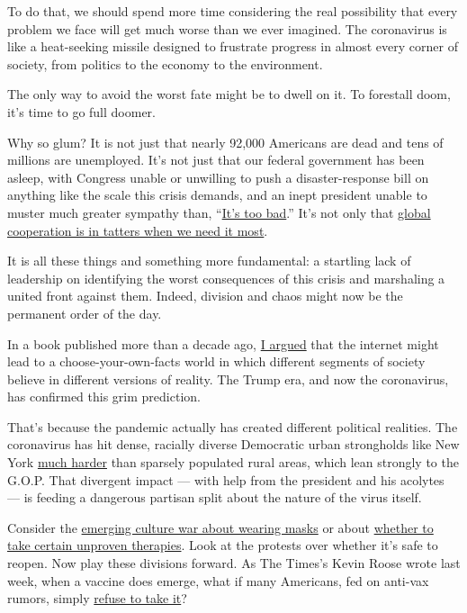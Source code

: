 To do that, we should spend more time considering the real possibility
that every problem we face will get much worse than we ever imagined.
The coronavirus is like a heat-seeking missile designed to frustrate
progress in almost every corner of society, from politics to the economy
to the environment.

The only way to avoid the worst fate might be to dwell on it. To
forestall doom, it's time to go full doomer.

Why so glum? It is not just that nearly 92,000 Americans are dead and
tens of millions are unemployed. It's not just that our federal
government has been asleep, with Congress unable or unwilling to push a
disaster-response bill on anything like the scale this crisis demands,
and an inept president unable to muster much greater sympathy than,
``\href{https://twitter.com/atrupar/status/1262769806639587329?s=21}{It's
too bad}.'' It's not only that
\href{https://www.nytimes.com/2020/05/19/us/coronavirus-updates.html\#link-1fe21236}{global
cooperation is in tatters when we need it most}.

It is all these things and something more fundamental: a startling lack
of leadership on identifying the worst consequences of this crisis and
marshaling a united front against them. Indeed, division and chaos might
now be the permanent order of the day.

In a book published more than a decade ago,
\href{https://www.nytimes.com/2016/11/03/technology/how-the-internet-is-loosening-our-grip-on-the-truth.html}{I
argued} that the internet might lead to a choose-your-own-facts world in
which different segments of society believe in different versions of
reality. The Trump era, and now the coronavirus, has confirmed this grim
prediction.

That's because the pandemic actually has created different political
realities. The coronavirus has hit dense, racially diverse Democratic
urban strongholds like New York
\href{https://www.npr.org/2020/04/12/832455226/what-coronavirus-exposes-about-americas-political-divide}{much
harder} than sparsely populated rural areas, which lean strongly to the
G.O.P. That divergent impact --- with help from the president and his
acolytes --- is feeding a dangerous partisan split about the nature of
the virus itself.

Consider the
\href{https://www.vox.com/2020/5/13/21257181/coronavirus-masks-trump-republicans-culture-war}{emerging
culture war about wearing masks} or about
\href{https://www.nytimes.com/2020/04/22/business/media/virus-fox-news-hydroxychloroquine.html}{whether
to take certain unproven therapies}. Look at the protests over whether
it's safe to reopen. Now play these divisions forward. As The Times's
Kevin Roose wrote last week, when a vaccine does emerge, what if many
Americans, fed on anti-vax rumors, simply
\href{https://www.nytimes.com/2020/05/13/technology/coronavirus-vaccine-disinformation.html}{refuse
to take it}?

